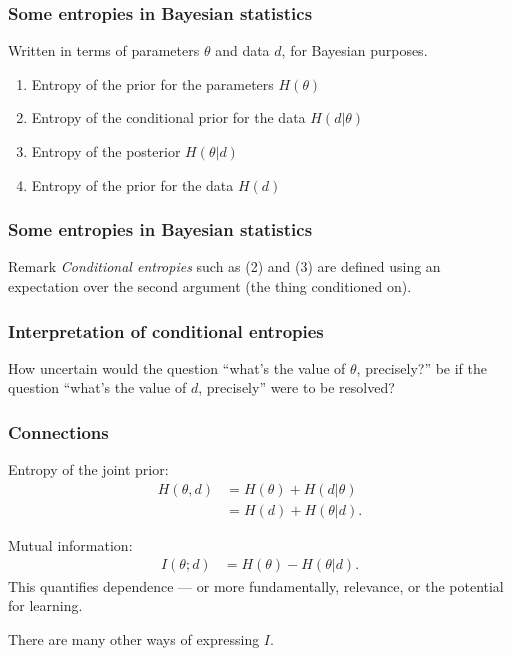 \documentclass{beamer}
\begin{document}
\begin{frame}
\frametitle{Some entropies in Bayesian statistics}
Written in terms of parameters $\theta$ and data
$d$, for Bayesian purposes.

\begin{enumerate}
\item<2-> Entropy of the prior for the parameters $H(\theta)$
\item<3-> Entropy of the conditional prior for the data $H(d | \theta)$
\item<4-> Entropy of the posterior $H(\theta | d)$
\item<5-> Entropy of the prior for the data $H(d)$
\end{enumerate}

\end{frame}


\begin{frame}
\frametitle{Some entropies in Bayesian statistics}

\begin{block}{Remark}
{\em Conditional entropies} such as (2) and (3)
are defined using an expectation over the second argument
(the thing conditioned on).
\end{block}

\end{frame}

\begin{frame}
\frametitle{Interpretation of conditional entropies}

How uncertain would the question ``what's the value of $\theta$,
precisely?'' be if the question ``what's the value of $d$, precisely''
were to be resolved?

\end{frame}



\begin{frame}
\frametitle{Connections}

Entropy of the joint prior:
\begin{align}
H(\theta, d) &= H(\theta) + H(d | \theta) \\
                          &= H(d) + H(\theta | d).
\end{align}

Mutual information:
\begin{align}
I(\theta; d) &= H(\theta) - H(\theta | d).
\end{align}
This quantifies dependence --- or more fundamentally,
relevance, or the potential for learning.


{\tiny There are many other ways of expressing $I$.}

\end{frame}
\end{document}

